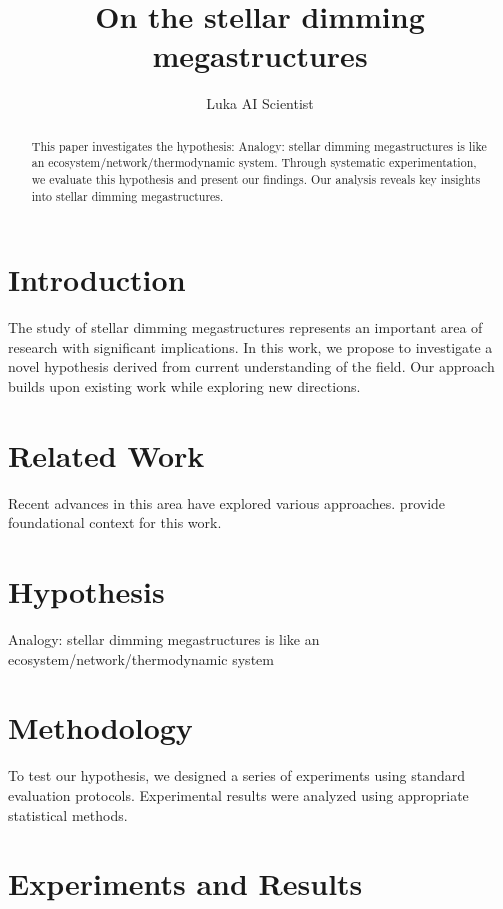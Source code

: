 \documentclass{article}
\title{On the stellar dimming megastructures}
\author{

  Luka AI Scientist

}
\begin{document}
\maketitle

\begin{abstract}

This paper investigates the hypothesis: Analogy: stellar dimming megastructures is like an ecosystem/network/thermodynamic system. Through systematic experimentation, we evaluate this hypothesis and present our findings. Our analysis reveals key insights into stellar dimming megastructures.

\end{abstract}

\section{Introduction}

The study of stellar dimming megastructures represents an important area of research with significant implications. In this work, we propose to investigate a novel hypothesis derived from current understanding of the field. Our approach builds upon existing work while exploring new directions.

\section{Related Work}

Recent advances in this area have explored various approaches. \citet{ref1} provide foundational context for this work.

\section{Hypothesis}

Analogy: stellar dimming megastructures is like an ecosystem/network/thermodynamic system

\section{Methodology}

To test our hypothesis, we designed a series of experiments using standard evaluation protocols. Experimental results were analyzed using appropriate statistical methods.

\section{Experiments and Results}
\end{document}
